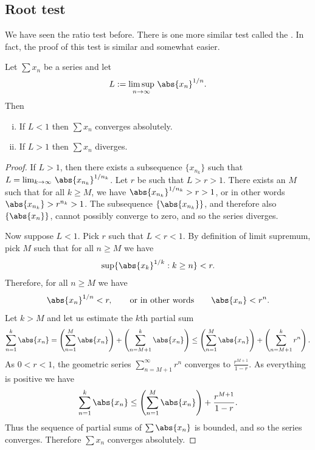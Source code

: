 \documentclass[12pt]{book}
\begin{document}
\subsection*{Root test}

We have seen the ratio test before.
There is one more similar
test called the \emph{}.
In fact, the 
proof of this test is similar and somewhat easier.

\begin{prop}
Let $\sum x_n$ be a series and let
\begin{equation*}
L := \limsup_{n\to\infty} \, {\abs{x_n}}^{1/n} .
\end{equation*}
Then
\begin{enumerate}[(i)]
\item If $L < 1$ then $\sum x_n$ converges absolutely.
\item If $L > 1$ then $\sum x_n$ diverges.
\end{enumerate}
\end{prop}

\begin{proof}
If $L > 1$, then there exists a subsequence $\{ x_{n_k} \}$ such that
$L = \lim_{k\to\infty} \, {\abs{x_{n_k}}}^{1/n_k}$.
Let
$r$ be such that $L > r > 1$.
There exists an $M$ such
that for all $k \geq M$, we have 
${\abs{x_{n_k}}}^{1/n_k} > r > 1$, or in other words
$\abs{x_{n_k}} > r^{n_k} > 1$.
The
subsequence 
$\{ \abs{x_{n_k}} \}$, and therefore also
$\{ \abs{x_{n}} \}$, cannot possibly converge to zero, and so the series
diverges.

Now suppose $L < 1$.
Pick $r$ such that $L < r < 1$.
By definition of limit supremum,
pick $M$ such that for all $n \geq M$ we have 
\begin{equation*}
\sup \{ {\abs{x_k}}^{1/k} : k \geq n \} < r .
\end{equation*}
Therefore, for all $n \geq M$ we have
\begin{equation*}
{\abs{x_n}}^{1/n} < r , \qquad \text{or in other words} \qquad \abs{x_n} < r^n .
\end{equation*}
Let $k > M$ and let us estimate the $k$th partial sum
\begin{equation*}
\sum_{n=1}^k \abs{x_n} = 
\left( \sum_{n=1}^M \abs{x_n} \right) + 
\left( \sum_{n=M+1}^k \abs{x_n} \right)
\leq
\left( \sum_{n=1}^M \abs{x_n} \right) + 
\left( \sum_{n=M+1}^k r^n \right) .
\end{equation*}
As $0 < r < 1$,
the geometric series $\sum_{n=M+1}^\infty r^n$ converges to
$\frac{r^{M+1}}{1-r}$.
As everything is positive we have
\begin{equation*}
\sum_{n=1}^k \abs{x_n} 
\leq
\left( \sum_{n=1}^M \abs{x_n} \right) + 
\frac{r^{M+1}}{1-r} .
\end{equation*}
Thus the sequence of partial sums of $\sum \abs{x_n}$ is bounded, and
so the series converges.
Therefore $\sum x_n$ converges absolutely.
\end{proof}
\end{document}
